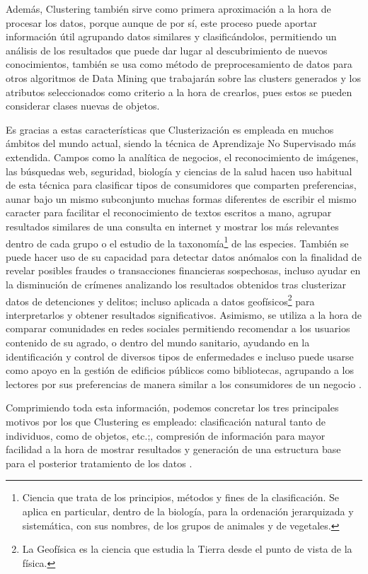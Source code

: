 \documentclass[3p,twocolumn]{elsarticle}
\begin{document}
Además, Clustering también sirve como primera aproximación a la hora de procesar los datos, porque aunque de por sí, este proceso puede aportar información útil agrupando datos similares y clasificándolos, permitiendo un análisis de los resultados que puede dar lugar al descubrimiento de nuevos conocimientos, también se usa como método de preprocesamiento de datos para otros algoritmos de Data Mining que trabajarán sobre las clusters generados y los atributos seleccionados como criterio a la hora de crearlos, pues estos se pueden considerar clases nuevas de objetos.

Es gracias a estas características que Clusterización es empleada en muchos ámbitos del mundo actual, siendo la técnica de Aprendizaje No Supervisado más extendida. Campos como la analítica de negocios, el reconocimiento de imágenes, las búsquedas web, seguridad, biología y ciencias de la salud hacen uso habitual de esta técnica para clasificar tipos de consumidores que comparten preferencias, aunar bajo un mismo subconjunto muchas formas diferentes de escribir el mismo caracter para facilitar el reconocimiento de textos escritos a mano, agrupar resultados similares de una consulta en internet y mostrar los más relevantes dentro de cada grupo o el estudio de la taxonomía\footnote{Ciencia que trata de los principios, métodos y fines de la clasificación. Se aplica en particular, dentro de la biología, para la ordenación jerarquizada y sistemática, con sus nombres, de los grupos de animales y de vegetales.} de las especies. También se puede hacer uso de su capacidad para detectar datos anómalos con la finalidad de revelar posibles fraudes o transacciones  financieras sospechosas, incluso ayudar en la disminución de crímenes analizando los resultados obtenidos tras clusterizar datos de detenciones y delitos; incluso aplicada a datos geofísicos\footnote{La Geofísica es la ciencia que estudia la Tierra desde el punto de vista de la física.} para interpretarlos y obtener resultados significativos. Asimismo, se utiliza a la hora de comparar comunidades en redes sociales permitiendo recomendar a los usuarios contenido de su agrado, o dentro del mundo sanitario, ayudando en la identificación y control de diversos tipos de enfermedades e incluso puede usarse como apoyo en la gestión de edificios públicos como bibliotecas, agrupando a los lectores por sus preferencias de manera similar a los consumidores de un negocio \cite{9,10,11,12,13}.

Comprimiendo toda esta información, podemos concretar los tres principales motivos por los que Clustering es empleado: clasificación natural tanto de individuos, como de objetos, etc.;, compresión de información para mayor facilidad a la hora de mostrar resultados y generación de una estructura base para el posterior tratamiento de los datos \cite{14}.
\end{document}
